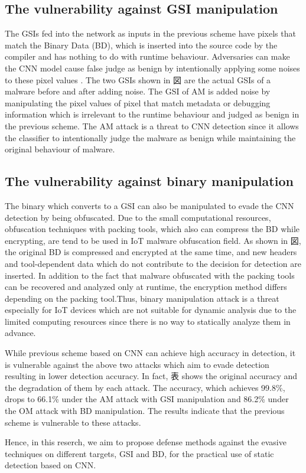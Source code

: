 \subsection{The vulnerability against GSI manipulation}
The GSIs fed into the network as inputs in the previous scheme have pixels that match the Binary Data (BD), which is inserted into the source code by the compiler and has nothing to do with runtime behaviour.
Adversaries can make the CNN model cause false judge as benign by intentionally applying some noises to these pixel values \cite{AM}.
The two GSIs shown in 図 are the actual GSIs of a malware before and after adding noise.
The GSI of AM is added noise by manipulating the pixel values of pixel that match metadata or debugging information which is irrelevant to the runtime behaviour and judged as benign in the previous scheme.
The AM attack is a threat to CNN detection since it allows the classifier to intentionally judge the malware as benign while maintaining the original behaviour of malware.

\subsection{The vulnerability against binary manipulation}
The binary which converts to a GSI can also be manipulated to evade the CNN detection by being obfuscated.
Due to the small computational resources, obfuscation techniques with packing tools, which also can compress the BD while encrypting, are tend to be used in IoT malware obfuscation field.
As shown in 図, the original BD is compressed and encrypted at the same time, and new headers and tool-dependent data which do not contribute to the decision for detection are inserted.
In addition to the fact that malware obfuscated with the packing tools can be recovered and analyzed only at runtime, the encryption method differs depending on the packing tool.Thus, binary manipulation attack is a threat especially for IoT devices which are not suitable for dynamic analysis due to the limited computing resources since there is no way to statically analyze them in advance.


While previous scheme based on CNN can achieve high accuracy in detection, it is vulnerable against the above two attacks which aim to evade detection resulting in lower detection accuracy.
In fact, 表 shows the original accuracy and the degradation of them by each attack.
The accuracy, which achieves 99.8\%, drops to 66.1\% under the AM attack with GSI manipulation and 86.2\% under the OM attack with BD manipulation.
The results indicate that the previous scheme is vulnerable to these attacks.

Hence, in this reserch, we aim to propose defense methods against the evasive techniques on different targets, GSI and BD, for the practical use of static detection based on CNN.

\newpage
